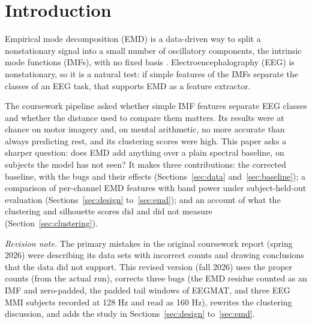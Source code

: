\section{Introduction}

Empirical mode decomposition (EMD) is a data-driven way to split a nonstationary signal into a small number of oscillatory components, the intrinsic mode functions (IMFs), with no fixed basis \cite{huang1998}. Electroencephalography (EEG) is nonstationary, so it is a natural test: if simple features of the IMFs separate the classes of an EEG task, that supports EMD as a feature extractor.

The coursework pipeline asked whether simple IMF features separate EEG classes and whether the distance used to compare them matters. Its results were at chance on motor imagery and, on mental arithmetic, no more accurate than always predicting rest, and its clustering scores were high. This paper asks a sharper question: does EMD add anything over a plain spectral baseline, on subjects the model has not seen? It makes three contributions: the corrected baseline, with the bugs and their effects (Sections~\ref{sec:data} and~\ref{sec:baseline}); a comparison of per-channel EMD features with band power under subject-held-out evaluation (Sections~\ref{sec:design} to~\ref{sec:emd}); and an account of what the clustering and silhouette scores did and did not measure (Section~\ref{sec:clustering}).

\emph{Revision note.} The primary mistakes in the original coursework report (spring 2026) were describing its data sets with incorrect counts and drawing conclusions that the data did not support. This revised version (fall 2026) uses the proper counts (from the actual run), corrects three bugs (the EMD residue counted as an IMF and zero-padded, the padded tail windows of EEGMAT, and three EEG MMI subjects recorded at 128 Hz and read as 160 Hz), rewrites the clustering discussion, and adds the study in Sections~\ref{sec:design} to~\ref{sec:emd}.
